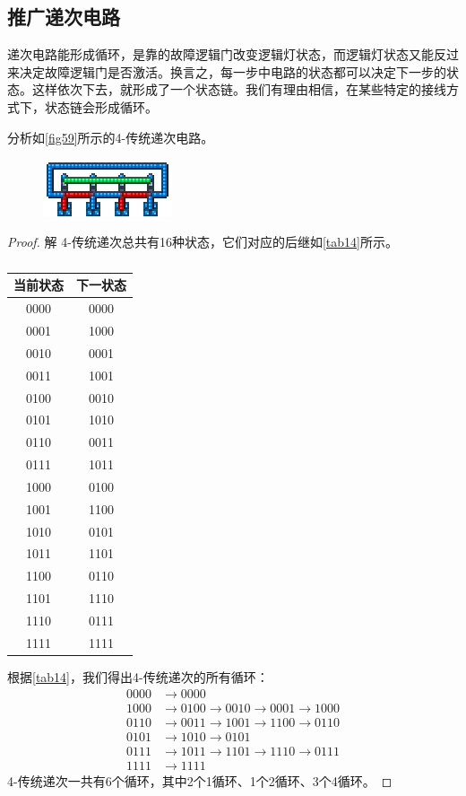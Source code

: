 \subsection{推广递次电路}
递次电路能形成循环，是靠的故障逻辑门改变逻辑灯状态，而逻辑灯状态又能反过来决定故障逻辑门是否激活。换言之，每一步中电路的状态都可以决定下一步的状态。这样依次下去，就形成了一个状态链。我们有理由相信，在某些特定的接线方式下，状态链会形成循环。

\begin{example}{}{}
分析如\autoref{fig59}所示的4-传统递次电路。
\begin{figure}[H]
\centering
\includegraphics{images/416.png}
\caption{}\label{fig59}
\end{figure}
\end{example}
\begin{proof}解
4-传统递次总共有16种状态，它们对应的后继如\autoref{tab14}所示。
\begin{table}[!ht]
\centering
\begin{tabular}{|c|c|}
\hline
当前状态&下一状态\\\hline
0000&0000\\\hline
0001&1000\\\hline
0010&0001\\\hline
0011&1001\\\hline
0100&0010\\\hline
0101&1010\\\hline
0110&0011\\\hline
0111&1011\\\hline
1000&0100\\\hline
1001&1100\\\hline
1010&0101\\\hline
1011&1101\\\hline
1100&0110\\\hline
1101&1110\\\hline
1110&0111\\\hline
1111&1111\\\hline
\end{tabular}
\caption{}\label{tab14}
\end{table}

根据\autoref{tab14}，我们得出4-传统递次的所有循环：
\begin{align*}
0000&\to 0000\\
1000&\to 0100\to 0010\to 0001\to 1000\\
0110&\to 0011\to 1001\to 1100\to 0110\\
0101&\to 1010\to 0101\\
0111&\to 1011\to 1101\to 1110\to 0111\\
1111&\to 1111
\end{align*}
4-传统递次一共有6个循环，其中2个1循环、1个2循环、3个4循环。
\end{proof}

